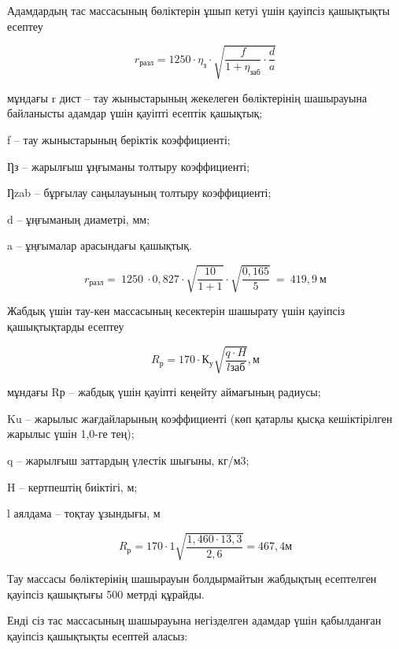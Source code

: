 \begin{multicols}{2}
Адамдардың тас массасының бөліктерін ұшып кетуі үшін қауіпсіз қашықтықты
есептеу

\begin{equation}
r_{\text{разл}} = 1250 \cdot \eta_{\text{з}} \cdot \sqrt{\frac{f}{1 + \eta_{\text{заб}}} \cdot \frac{d}{a}}
\end{equation}

мұндағы r дист -- тау жыныстарының жекелеген бөліктерінің шашырауына
байланысты адамдар үшін қауіпті есептік қашықтық;

f -- тау жыныстарының беріктік коэффициенті;

Ƞз -- жарылғыш ұңғыманы толтыру коэффициенті;

Ƞzab -- бұрғылау саңылауының толтыру коэффициенті;

d -- ұңғыманың диаметрі, мм;

a -- ұңғымалар арасындағы қашықтық.

\begin{equation*}
r_{\text{разл}} = \ 1250\  \cdot 0,827 \cdot \sqrt{\frac{10}{1 + 1}} \cdot \sqrt{\frac{0,165}{5}}\  = \ 419,9\ \text{м}
\end{equation*}

Жабдық үшін тау-кен массасының кесектерін шашырату үшін қауіпсіз
қашықтықтарды есептеу


\begin{equation}
    R_{\text{р}}=170 \cdot \text{К}_{\text{у}}\sqrt{\frac{q \cdot H}{l\text{заб}}},\text{м}
\end{equation}

мұндағы Rр -- жабдық үшін қауіпті кеңейту аймағының радиусы;

Ku -- жарылыс жағдайларының коэффициенті (көп қатарлы қысқа
кешіктірілген жарылыс үшін 1,0-ге тең);

q -- жарылғыш заттардың үлестік шығыны, кг/м3;

H -- кертпештің биіктігі, м;

l аялдама -- тоқтау ұзындығы, м

\begin{equation*}
    R_{\text{р}}=170 \cdot 1 \sqrt{\frac{1,460  \cdot 13,3}{2,6}} = 467,4 \text{м}
\end{equation*}

Тау массасы бөліктерінің шашырауын болдырмайтын жабдықтың есептелген
қауіпсіз қашықтығы 500 метрді құрайды.

Енді сіз тас массасының шашырауына негізделген адамдар үшін қабылданған
қауіпсіз қашықтықты есептей аласыз:


\end{multicols}
